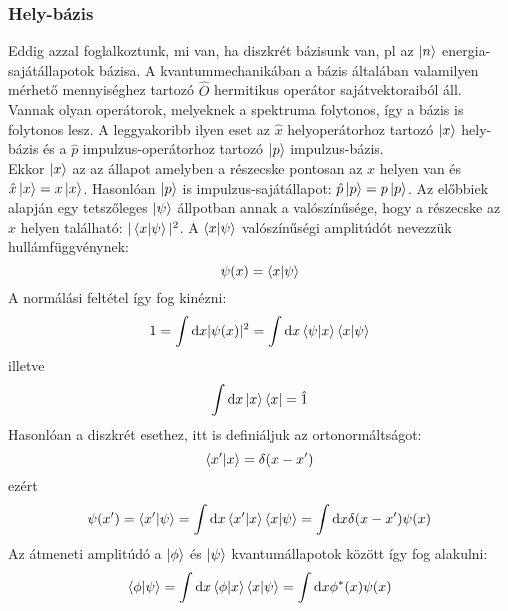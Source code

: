 \documentclass[12pt]{article}
\theoremstyle{plain}
\newcommand{\dd}{\mathrm{d}}
\begin{document}
\subsubsection{Hely-bázis}
Eddig azzal foglalkoztunk, mi van, ha diszkrét bázisunk van, pl az $\ket n$ energia-sajátállapotok bázisa. 
A kvantummechanikában a bázis általában valamilyen mérhető mennyiséghez tartozó $\hat O$ hermitikus operátor sajátvektoraiból áll.
Vannak olyan operátorok, melyeknek a spektruma folytonos, így a bázis is folytonos lesz.
A leggyakoribb ilyen eset az $\hat x$ helyoperátorhoz tartozó $\ket x$ hely-bázis és a $\hat p$ impulzus-operátorhoz
tartozó $\ket p$ impulzus-bázis.
\\
Ekkor $\ket x$ az az állapot amelyben a részecske pontosan az $x$ helyen van és $\hat x\ket x = x\ket x$.
Hasonlóan $\ket p$ is impulzus-sajátállapot: $\hat p\ket p = p\ket p$.
Az előbbiek alapján egy tetszőleges $\ket\psi$ állpotban annak a valószínűsége, hogy a részecske az $x$ helyen található:
$|\braket{x|\psi}|^2$. A $\braket{x|\psi}$ valószínűségi amplitúdót nevezzük hullámfüggvénynek:
\begin{equation}
    \psi(x)=\braket{x|\psi}
\end{equation}
A normálási feltétel így fog kinézni:
\begin{equation}
    1 = \int\dd x |\psi(x)|^2 = \int\dd x \braket{\psi|x}\braket{x|\psi}
\end{equation} 
illetve
\begin{equation}
    \int\dd x \ket x \bra x = \hat 1
\end{equation}
Hasonlóan a diszkrét esethez, itt is definiáljuk az ortonormáltságot:
\begin{equation}
    \braket{x'|x} = \delta(x-x')
\end{equation}
ezért 
\begin{equation}
    \psi(x') = \braket{x'|\psi} = \int\dd x \braket{x'|x}\braket{x|\psi} = \int\dd x \delta (x-x')\psi(x)
\end{equation}
Az átmeneti amplitúdó a $\ket\phi$ és $\ket\psi$ kvantumállapotok között így fog alakulni:
\begin{equation}
    \braket{\phi|\psi} = \int\dd x \braket{\phi|x}\braket{x|\psi} = \int\dd x \phi^{*}(x)\psi(x)
\end{equation}
\end{document}
